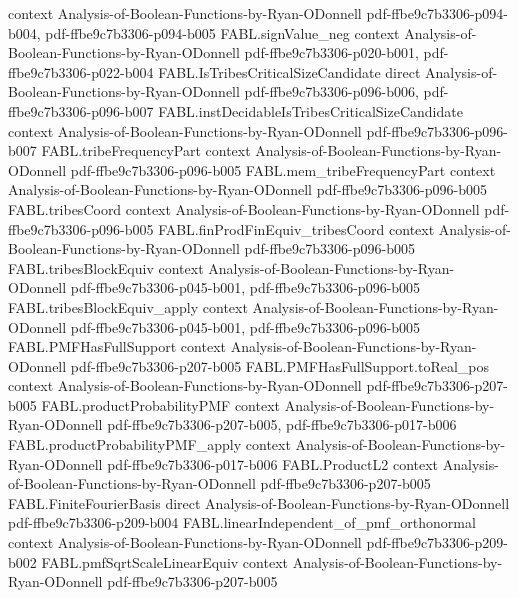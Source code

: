 \begin{theorem}
  {context}
  {Analysis-of-Boolean-Functions-by-Ryan-ODonnell}
  {pdf-ffbe9c7b3306-p094-b004,
    pdf-ffbe9c7b3306-p094-b005}
\proofstep
  {FABL.signValue_neg}
  {context}
  {Analysis-of-Boolean-Functions-by-Ryan-ODonnell}
  {pdf-ffbe9c7b3306-p020-b001,
    pdf-ffbe9c7b3306-p022-b004}
\proofstep
  {FABL.IsTribesCriticalSizeCandidate}
  {direct}
  {Analysis-of-Boolean-Functions-by-Ryan-ODonnell}
  {pdf-ffbe9c7b3306-p096-b006,
    pdf-ffbe9c7b3306-p096-b007}
\proofstep
  {FABL.instDecidableIsTribesCriticalSizeCandidate}
  {context}
  {Analysis-of-Boolean-Functions-by-Ryan-ODonnell}
  {pdf-ffbe9c7b3306-p096-b007}
\proofstep
  {FABL.tribeFrequencyPart}
  {context}
  {Analysis-of-Boolean-Functions-by-Ryan-ODonnell}
  {pdf-ffbe9c7b3306-p096-b005}
\proofstep
  {FABL.mem_tribeFrequencyPart}
  {context}
  {Analysis-of-Boolean-Functions-by-Ryan-ODonnell}
  {pdf-ffbe9c7b3306-p096-b005}
\proofstep
  {FABL.tribesCoord}
  {context}
  {Analysis-of-Boolean-Functions-by-Ryan-ODonnell}
  {pdf-ffbe9c7b3306-p096-b005}
\proofstep
  {FABL.finProdFinEquiv_tribesCoord}
  {context}
  {Analysis-of-Boolean-Functions-by-Ryan-ODonnell}
  {pdf-ffbe9c7b3306-p096-b005}
\proofstep
  {FABL.tribesBlockEquiv}
  {context}
  {Analysis-of-Boolean-Functions-by-Ryan-ODonnell}
  {pdf-ffbe9c7b3306-p045-b001,
    pdf-ffbe9c7b3306-p096-b005}
\proofstep
  {FABL.tribesBlockEquiv_apply}
  {context}
  {Analysis-of-Boolean-Functions-by-Ryan-ODonnell}
  {pdf-ffbe9c7b3306-p045-b001,
    pdf-ffbe9c7b3306-p096-b005}
\proofstep
  {FABL.PMFHasFullSupport}
  {context}
  {Analysis-of-Boolean-Functions-by-Ryan-ODonnell}
  {pdf-ffbe9c7b3306-p207-b005}
\proofstep
  {FABL.PMFHasFullSupport.toReal_pos}
  {context}
  {Analysis-of-Boolean-Functions-by-Ryan-ODonnell}
  {pdf-ffbe9c7b3306-p207-b005}
\proofstep
  {FABL.productProbabilityPMF}
  {context}
  {Analysis-of-Boolean-Functions-by-Ryan-ODonnell}
  {pdf-ffbe9c7b3306-p207-b005,
    pdf-ffbe9c7b3306-p017-b006}
\proofstep
  {FABL.productProbabilityPMF_apply}
  {context}
  {Analysis-of-Boolean-Functions-by-Ryan-ODonnell}
  {pdf-ffbe9c7b3306-p017-b006}
\proofstep
  {FABL.ProductL2}
  {context}
  {Analysis-of-Boolean-Functions-by-Ryan-ODonnell}
  {pdf-ffbe9c7b3306-p207-b005}
\proofstep
  {FABL.FiniteFourierBasis}
  {direct}
  {Analysis-of-Boolean-Functions-by-Ryan-ODonnell}
  {pdf-ffbe9c7b3306-p209-b004}
\proofstep
  {FABL.linearIndependent_of_pmf_orthonormal}
  {context}
  {Analysis-of-Boolean-Functions-by-Ryan-ODonnell}
  {pdf-ffbe9c7b3306-p209-b002}
\proofstep
  {FABL.pmfSqrtScaleLinearEquiv}
  {context}
  {Analysis-of-Boolean-Functions-by-Ryan-ODonnell}
  {pdf-ffbe9c7b3306-p207-b005}

\end{theorem}
